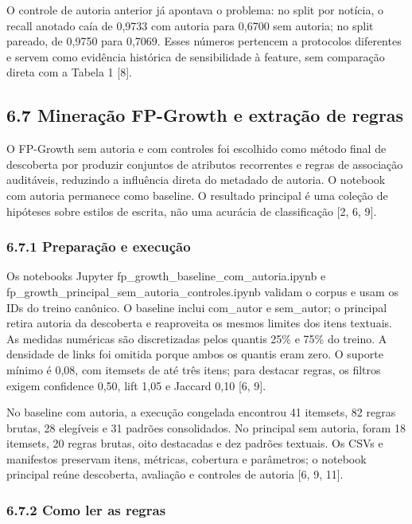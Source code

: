 \documentclass[
  brazilian,
  11pt,
]{article}
\begin{document}
O controle de autoria anterior já apontava o problema: no split por notícia, o recall anotado caía de 0,9733 com autoria para 0,6700 sem autoria; no split pareado, de 0,9750 para 0,7069. Esses números pertencem a protocolos diferentes e servem como evidência histórica de sensibilidade à feature, sem comparação direta com a Tabela 1 {[}8{]}.

\subsection{6.7 Mineração FP-Growth e extração de regras}\label{minerauxe7uxe3o-fp-growth-e-extrauxe7uxe3o-de-regras}

O FP-Growth sem autoria e com controles foi escolhido como método final de descoberta por produzir conjuntos de atributos recorrentes e regras de associação auditáveis, reduzindo a influência direta do metadado de autoria. O notebook com autoria permanece como baseline. O resultado principal é uma coleção de hipóteses sobre estilos de escrita, não uma acurácia de classificação {[}2, 6, 9{]}.

\subsubsection{6.7.1 Preparação e execução}\label{preparauxe7uxe3o-e-execuuxe7uxe3o}

Os notebooks Jupyter fp\_growth\_baseline\_com\_autoria.ipynb e fp\_growth\_principal\_sem\_autoria\_controles.ipynb validam o corpus e usam os IDs do treino canônico. O baseline inclui com\_autor e sem\_autor; o principal retira autoria da descoberta e reaproveita os mesmos limites dos itens textuais. As medidas numéricas são discretizadas pelos quantis 25\% e 75\% do treino. A densidade de links foi omitida porque ambos os quantis eram zero. O suporte mínimo é 0,08, com itemsets de até três itens; para destacar regras, os filtros exigem confidence 0,50, lift 1,05 e Jaccard 0,10 {[}6, 9{]}.

No baseline com autoria, a execução congelada encontrou 41 itemsets, 82 regras brutas, 28 elegíveis e 31 padrões consolidados. No principal sem autoria, foram 18 itemsets, 20 regras brutas, oito destacadas e dez padrões textuais. Os CSVs e manifestos preservam itens, métricas, cobertura e parâmetros; o notebook principal reúne descoberta, avaliação e controles de autoria {[}6, 9, 11{]}.

\subsubsection{6.7.2 Como ler as regras}\label{como-ler-as-regras}
\end{document}

